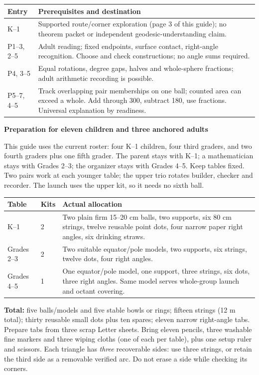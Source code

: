 \documentclass[11pt,letterpaper]{article}
\newcommand{\topic}[1]{\par{\large\bfseries\color{blue}#1}\par}
\begin{document}
\begin{tabular}{@{}p{.82in}p{5.95in}@{}}
\toprule
Entry & Prerequisites and destination\\\midrule
K--1 & Supported route/corner exploration (page 3 of this guide); no theorem packet or independent geodesic-understanding claim.\\
P1--3, 2--5 & Adult reading; fixed endpoints, surface contact, right-angle recognition. Choose and check constructions; no angle sums required.\\
P4, 3--5 & Equal rotations, degree gaps, halves and whole-sphere fractions; adult arithmetic recording is possible.\\
P5--7, 4--5 & Track overlapping pair memberships on one ball; counted area can exceed a whole. Add through 300, subtract 180, use fractions. Universal explanation by readiness.\\\bottomrule
\end{tabular}

\newpage
\topic{Preparation for eleven children and three anchored adults}
This guide uses the current roster: four K--1 children, four third graders, and two fourth graders plus one fifth grader. The parent stays with K--1; a mathematician stays with Grades 2--3; the organizer stays with Grades 4--5. Keep tables fixed. Two pairs work at each younger table; the upper trio rotates builder, checker and recorder. The launch uses the upper kit, so it needs no sixth ball.

\begin{tabular}{@{}p{1.04in}p{.56in}p{5.17in}@{}}
\toprule
Table & Kits & Actual allocation\\\midrule
K--1 & 2 & Two plain firm 15--20 cm balls, two supports, six 80 cm strings, twelve reusable point dots, four narrow paper right angles, six drinking straws.\\
Grades 2--3 & 2 & Two suitable equator/pole models, two supports, six strings, twelve dots, four right angles.\\
Grades 4--5 & 1 & One equator/pole model, one support, three strings, six dots, three right angles. Same model serves whole-group launch and octant covering.\\\bottomrule
\end{tabular}

\textbf{Total:} five balls/models and five stable bowls or rings; fifteen strings (12 m total); thirty reusable small dots plus ten spares; eleven narrow right-angle tabs. Prepare tabs from three scrap Letter sheets. Bring eleven pencils, three washable fine markers and three wiping cloths (one of each per table), plus one setup ruler and scissors. Each triangle has \emph{three} recoverable sides: use three strings, or retain the third side as a removable verified arc. Do not erase a side while checking its corners.
\end{document}
